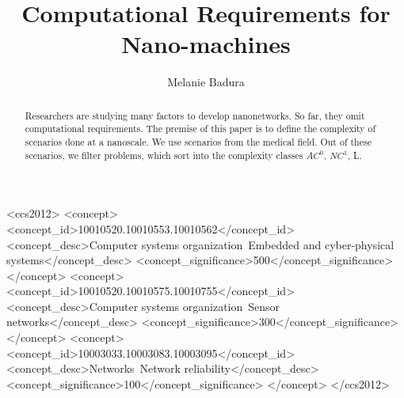\documentclass[10pt,sigconf]{acmart}
\begin{document}
\title{Computational Requirements for Nano-machines}

\author{Melanie Badura}




\renewcommand{\shortauthors}{M. Badura et al.}


\begin{abstract}
Researchers are studying many factors to develop nanonetworks.
So far, they omit computational requirements.
The premise of this paper is to define the complexity of scenarios done at a nanoscale.
We use scenarios from the medical field.
Out of these scenarios, we filter problems, which sort into the complexity classes $AC^0$, $NC^1$, L.
\end{abstract}

%
%
\begin{CCSXML}
<ccs2012>
 <concept>
  <concept_id>10010520.10010553.10010562</concept_id>
  <concept_desc>Computer systems organization~Embedded and cyber-physical systems</concept_desc>
  <concept_significance>500</concept_significance>
 </concept>
 <concept>
  <concept_id>10010520.10010575.10010755</concept_id>
  <concept_desc>Computer systems organization~Sensor networks</concept_desc>
  <concept_significance>300</concept_significance>
 </concept>
 <concept>
  <concept_id>10003033.10003083.10003095</concept_id>
  <concept_desc>Networks~Network reliability</concept_desc>
  <concept_significance>100</concept_significance>
 </concept>
</ccs2012>  
\end{CCSXML}






\maketitle
\end{document}
